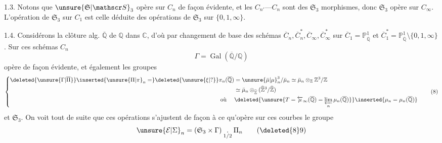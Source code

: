1.3. Notons que $\unsure{\mathfrak S|\mathscr S}_3$ opère sur $C_n$ de façon
évidente, et les $C_{n'}\text{---}C_n$ sont des $\mathfrak S_3$
morphismes, donc $\mathfrak S_3$ opère sur $C_\infty$.
L'opération de $\mathfrak S_3$ sur $C_1$  est celle
déduite des opérations de $\mathfrak S_3$ sur $\{0,1,\infty\}$.

1.4. Considérons la clôture alg. $\overline{\mathbb Q}$ de $\mathbb Q$ dans $\mathbb C$,
d'où par changement de base des
schémas $\overline C_n,\overline C_n^*,\overline C_\infty,\overline C_\infty^*$ sur $\overline C_1=\mathbb P^1_{\overline{\mathbb Q}}$
et $\overline C_1^*=\mathbb P^1_{\overline{\mathbb Q}}\setminus\{0,1,\infty\}$. Sur ces schémas $C_n$
\[
\Gamma=\operatorname{Gal}(\overline{\mathbb Q}/\mathbb Q)\tag*{(7)}
\]
opère de façon évidente, et également les
groupes
\[
\left\{\begin{aligned}
\deleted{\unsure{\Gamma|\overline{\Pi}}}\inserted{\unsure{\Pi|\pi}_n=}\deleted{\unsure{\xi|?}}\pi_n(\overline{\mathbb Q})&=
\unsure{\bar\mu|\mu}_n^3/\bar\mu_n\simeq\bar\mu_n\otimes_{\mathbb Z}\mathbb Z^3/\mathbb Z\\
&\simeq\bar\mu_n\otimes_{\widehat{\mathbb Z}}(\widehat{\mathbb Z}^{3}/\widehat{\mathbb Z})\\
\text{où }\quad &\deleted{\unsure{T=\overleftarrow{\mu}_\infty(\overline{\mathbb Q})=\varprojlim_n\mu_n(\overline{\mathbb Q})}}\inserted{\mu_n=\mu_n(\overline{\mathbb Q})}
\end{aligned}\right.\tag*{(8)}
\]
et $\mathfrak S_3$. On voit tout de suite que
ces opérations s'ajustent de façon à ce
qu'opère sur ces courbes le groupe
\[
\unsure{\mathcal E|\Sigma}_n=(\mathfrak S_3\times\Gamma)\underset{1/2}{\mathbin{.}}\Pi_n\tag*{(\deleted{8}9)}
\]
